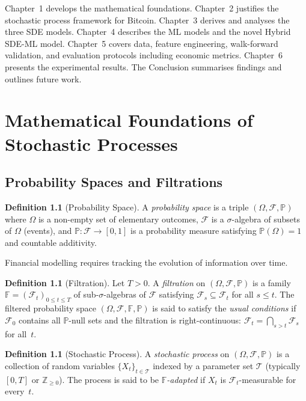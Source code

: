 \documentclass[12pt, a4paper, oneside]{report}
\theoremstyle{plain}
\theoremstyle{definition}
\newtheorem{definition}[theorem]{Definition}
\theoremstyle{remark}
\newcommand{\Prob}{\mathbb{P}}
\newcommand{\F}{\mathcal{F}}
\begin{document}
Chapter~1 develops the mathematical foundations.
Chapter~2 justifies the stochastic process framework for Bitcoin.
Chapter~3 derives and analyses the three SDE models.
Chapter~4 describes the ML models and the novel Hybrid SDE-ML model.
Chapter~5 covers data, feature engineering, walk-forward validation, and
evaluation protocols including economic metrics.
Chapter~6 presents the experimental results.
The Conclusion summarises findings and outlines future work.

\clearpage
\chapter{Mathematical Foundations of Stochastic Processes}
\label{ch:math}

\section{Probability Spaces and Filtrations}

\begin{definition}[Probability Space]
A \emph{probability space} is a triple $(\Omega, \F, \Prob)$ where $\Omega$ is a
non-empty set of elementary outcomes, $\F$ is a $\sigma$-algebra of subsets of
$\Omega$ (events), and $\Prob : \F \to [0,1]$ is a probability measure satisfying
$\Prob(\Omega) = 1$ and countable additivity.
\end{definition}

Financial modelling requires tracking the evolution of information over time.

\begin{definition}[Filtration]
Let $T > 0$.  A \emph{filtration} on $(\Omega, \F, \Prob)$ is a family
$\mathbb{F} = (\F_t)_{0 \leq t \leq T}$ of sub-$\sigma$-algebras of $\F$ satisfying
$\F_s \subseteq \F_t$ for all $s \leq t$.  The filtered probability space
$(\Omega, \F, \mathbb{F}, \Prob)$ is said to satisfy the \emph{usual conditions}
if $\F_0$ contains all $\Prob$-null sets and the filtration is right-continuous:
$\F_t = \bigcap_{s > t} \F_s$ for all~$t$.
\end{definition}

\begin{definition}[Stochastic Process]
A \emph{stochastic process} on $(\Omega, \F, \Prob)$ is a collection of random
variables $\{X_t\}_{t \in \mathcal{T}}$ indexed by a parameter set $\mathcal{T}$
(typically $[0,T]$ or $\mathbb{Z}_{\geq 0}$).  The process is said to be
\emph{$\mathbb{F}$-adapted} if $X_t$ is $\F_t$-measurable for every~$t$.
\end{definition}
\end{document}
